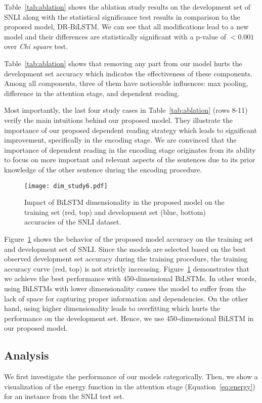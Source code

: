 \documentclass[11pt,a4paper]{article}
\begin{document}
	Table~\ref{tab:ablation} shows the ablation study results on the development set of SNLI along with the statistical significance test results in comparison to the proposed model, DR-BiLSTM. We can see that all modifications lead to a new model and their differences are statistically significant with a p-value of $<0.001$ over \emph{Chi square} test.
	
	Table~\ref{tab:ablation} shows that removing any part from our model hurts the development set accuracy which indicates the effectiveness of these components. Among all components, three of them have noticeable influences: max pooling, difference in the attention stage, and dependent reading. 
	
	Most importantly, the last four study cases in Table~\ref{tab:ablation} (rows 8-11) verify the main intuitions behind our proposed model. They illustrate the importance of our proposed dependent reading strategy which leads to significant improvement, specifically in the encoding stage. We are convinced that the importance of dependent reading in the encoding stage originates from its ability to focus on more important and relevant aspects of the sentences due to its prior knowledge of the other sentence during the encoding procedure.
	
	\begin{figure}[ht]
		\centering
		\texttt{[image: dim\_study6.pdf]}
		\caption{Impact of BiLSTM dimensionality in the proposed model on the training set (red, top) and development set (blue, bottom) accuracies of the SNLI dataset. \label{fig:dim:abl}}
	\end{figure}
	
	Figure~\ref{fig:dim:abl} shows the behavior of the proposed model accuracy on the training set and development set of SNLI. Since the models are selected based on the best observed development set accuracy during the training procedure, the training accuracy curve (red, top) is not strictly increasing. Figure~\ref{fig:dim:abl} demonstrates that we achieve the best performance with 450-dimensional BiLSTMs. In other words, using BiLSTMs with lower dimensionality causes the model to suffer from the lack of space for capturing proper information and dependencies. On the other hand, using higher dimensionality leads to overfitting which hurts the performance on the development set. Hence, we use 450-dimensional BiLSTM in our proposed model.
	
	\subsection{Analysis} \label{sec:err}
	We first investigate the performance of our models categorically. Then, we show a visualization of the energy function in the attention stage (Equation~\ref{eq:energy}) for an instance from the SNLI test set. 
	
\end{document}
